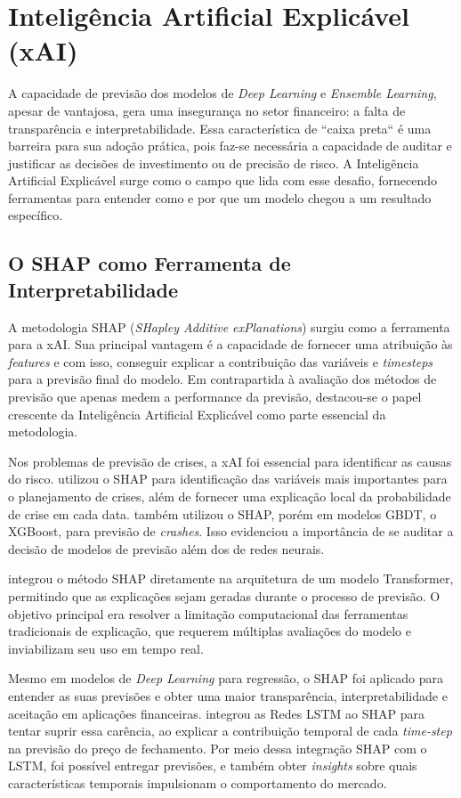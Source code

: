 \section{Inteligência Artificial Explicável (xAI)}

A capacidade de previsão dos modelos de \textit{Deep Learning} e \textit{Ensemble Learning}, apesar de vantajosa, gera uma insegurança no setor financeiro: a falta de transparência e interpretabilidade. Essa característica de ``caixa preta`` é uma barreira para sua adoção prática, pois faz-se necessária a capacidade de auditar e justificar as decisões de investimento ou de precisão de risco. A Inteligência Artificial Explicável surge como o campo que lida com esse desafio, fornecendo ferramentas para entender como e por que um modelo chegou a um resultado específico.

\subsection{O SHAP como Ferramenta de Interpretabilidade}

A metodologia SHAP (\textit{SHapley Additive exPlanations}) surgiu como a ferramenta para a xAI. Sua principal vantagem é a capacidade de fornecer uma atribuição às \textit{features} e com isso, conseguir explicar a contribuição das variáveis e \textit{timesteps} para a previsão final do modelo. Em contrapartida à avaliação dos métodos de previsão que apenas medem a performance da previsão, destacou-se o papel crescente da Inteligência Artificial Explicável como parte essencial da metodologia.

Nos problemas de previsão de crises, a xAI foi essencial para identificar as causas do risco.  utilizou o SHAP para identificação das variáveis mais importantes para o planejamento de crises, além de fornecer uma explicação local da probabilidade de crise em cada data.  também utilizou o SHAP, porém em modelos GBDT, o XGBoost, para previsão de \textit{crashes}. Isso evidenciou a importância de se auditar a decisão de modelos de previsão além dos de redes neurais. 

 integrou o método SHAP diretamente na arquitetura de um modelo Transformer, permitindo que as explicações sejam geradas durante o processo de previsão. O objetivo principal era resolver a limitação computacional das ferramentas tradicionais de explicação, que requerem múltiplas avaliações do modelo e inviabilizam seu uso em tempo real.

Mesmo em modelos de \textit{Deep Learning} para regressão, o SHAP foi aplicado para entender as suas previsões e obter uma maior transparência, interpretabilidade e aceitação em aplicações financeiras.  integrou as Redes LSTM ao SHAP para tentar suprir essa carência, ao explicar a contribuição temporal de cada \textit{time-step} na previsão do preço de fechamento. Por meio dessa integração SHAP com o LSTM, foi possível entregar previsões, e também obter \textit{insights} sobre quais características temporais impulsionam o comportamento do mercado.